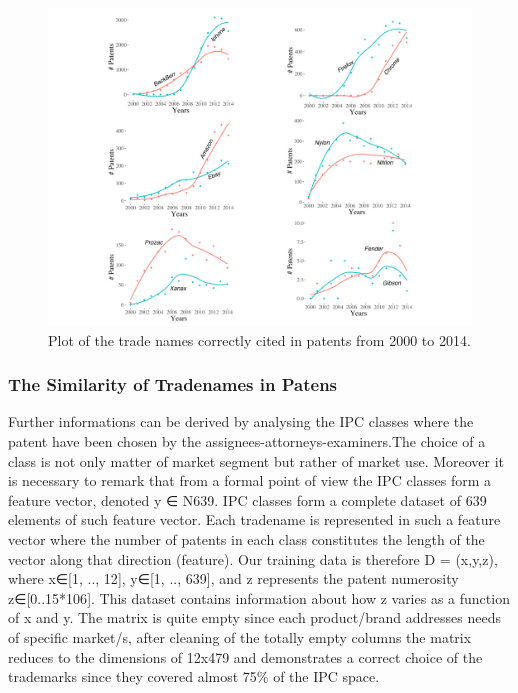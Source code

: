 \documentclass[]{book}
\begin{document}
\begin{figure}

{\centering \includegraphics[width=0.8\linewidth]{_bookdown_files/figures/Marks_Years} 

}

\caption{Plot of the trade names correctly cited in patents from 2000 to 2014.}\label{fig:populartm}
\end{figure}

\subsubsection{The Similarity of Tradenames in
Patens}\label{the-similarity-of-tradenames-in-patens}

Further informations can be derived by analysing the IPC classes where
the patent have been chosen by the assignees-attorneys-examiners.The
choice of a class is not only matter of market segment but rather of
market use. Moreover it is necessary to remark that from a formal point
of view the IPC classes form a feature vector, denoted y ∈ N639. IPC
classes form a complete dataset of 639 elements of such feature vector.
Each tradename is represented in such a feature vector where the number
of patents in each class constitutes the length of the vector along that
direction (feature). Our training data is therefore D = (x,y,z), where
x∈{[}1, .., 12{]}, y∈{[}1, .., 639{]}, and z represents the patent
numerosity z∈{[}0..15*106{]}. This dataset contains information about
how z varies as a function of x and y. The matrix is quite empty since
each product/brand addresses needs of specific market/s, after cleaning
of the totally empty columns the matrix reduces to the dimensions of
12x479 and demonstrates a correct choice of the trademarks since they
covered almost 75\% of the IPC space.
\end{document}
